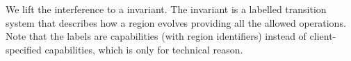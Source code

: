 
We lift the interference to a invariant.
The invariant is a labelled transition system that describes how a region evolves providing all the allowed operations.
Note that the labels are capabilities (with region identifiers) instead of client-specified capabilities, which is only for technical reason.


